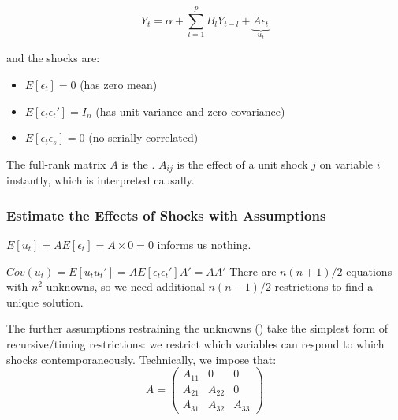             \begin{equation*}
                Y_t = \alpha + \sum_{l=1}^p B_l Y_{t-l} + \underbrace{A\epsilon_t}_{u_t}
            \end{equation*}
            
            and the shocks are:
            
            \begin{itemize}
                \item $E[\epsilon_t]=0$ (has zero mean)
                \item $E[\epsilon_t \epsilon_t']=I_n$ (has unit variance and zero covariance)
                \item $E[\epsilon_t \epsilon_s]=0$ (no serially correlated)
            \end{itemize}
    
            The full-rank matrix $A$ is the . $A_{ij}$ is the effect of a unit shock $j$ on variable $i$ instantly, which is interpreted causally.

        \subsubsection{Estimate the Effects of Shocks with Assumptions}

            $E[u_t]=AE[\epsilon_t]=A\times 0=0$ informs us nothing.

            $Cov(u_t)=E[u_tu_t']=AE[\epsilon_t\epsilon_t']A'=AA'$ There are $n(n+1)/2$ equations with $n^2$ unknowns, so we need additional $n(n-1)/2$ restrictions to find a unique solution.

            The further assumptions restraining the unknowns () take the simplest form of recursive/timing restrictions: we restrict which variables can respond to which shocks contemporaneously. Technically, we impose that:
            \begin{equation}
                A=\begin{pmatrix}
                A_{11} & 0 & 0\\
                A_{21} & A_{22} & 0\\
                A_{31} & A_{32} & A_{33}
            \end{pmatrix}
            \label{eqn:SVAR_assumption_2}
            \tag{SVAR Assumption 2}
            \end{equation}
            
